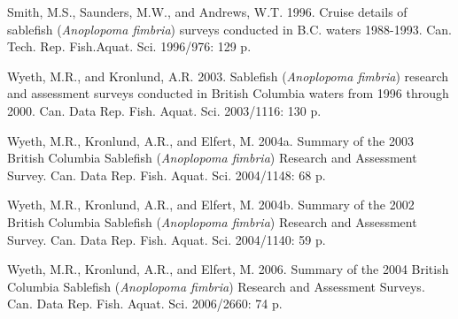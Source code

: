 \documentclass[12pt]{article}\usepackage[]{graphicx}\usepackage[]{color}
\begin{document}
\leavevmode\hypertarget{ref-Smith1996}{}%
Smith, M.S., Saunders, M.W., and Andrews, W.T. 1996. Cruise details of sablefish (\emph{Anoplopoma fimbria}) surveys conducted in B.C. waters 1988-1993. Can. Tech. Rep. Fish.Aquat. Sci. 1996/976: 129 p.

\leavevmode\hypertarget{ref-Wyeth2003}{}%
Wyeth, M.R., and Kronlund, A.R. 2003. Sablefish (\emph{Anoplopoma fimbria}) research and assessment surveys conducted in British Columbia waters from 1996 through 2000. Can. Data Rep. Fish. Aquat. Sci. 2003/1116: 130 p.

\leavevmode\hypertarget{ref-Wyeth2004b}{}%
Wyeth, M.R., Kronlund, A.R., and Elfert, M. 2004a. Summary of the 2003 British Columbia Sablefish (\emph{Anoplopoma fimbria}) Research and Assessment Survey. Can. Data Rep. Fish. Aquat. Sci. 2004/1148: 68 p.

\leavevmode\hypertarget{ref-Wyeth2004a}{}%
Wyeth, M.R., Kronlund, A.R., and Elfert, M. 2004b. Summary of the 2002 British Columbia Sablefish (\emph{Anoplopoma fimbria}) Research and Assessment Survey. Can. Data Rep. Fish. Aquat. Sci. 2004/1140: 59 p.

\leavevmode\hypertarget{ref-Wyeth2006}{}%
Wyeth, M.R., Kronlund, A.R., and Elfert, M. 2006. Summary of the 2004 British Columbia Sablefish (\emph{Anoplopoma fimbria}) Research and Assessment Surveys. Can. Data Rep. Fish. Aquat. Sci. 2006/2660: 74 p.
\end{document}
